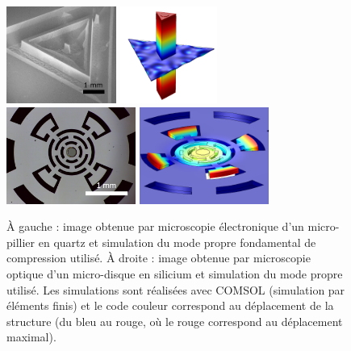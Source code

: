 \documentclass[12pt,a4paper]{article}
\begin{document}
\begin{figure}
\center
\includegraphics[height=90pt]{figures/micropillar.png}
\includegraphics[height=90pt]{figures/micropillar_disp.png}
\includegraphics[height=90pt]{figures/microwheel.png}
\includegraphics[height=90pt]{figures/microwheel_disp.png}
\caption{À gauche : image obtenue par microscopie électronique d'un micro-pillier en quartz et simulation du mode propre fondamental de compression utilisé.
À droite : image obtenue par microscopie optique d'un micro-disque en silicium et simulation du mode propre utilisé.
Les simulations sont réalisées avec COMSOL (simulation par éléments finis) et le code couleur correspond au déplacement de la structure (du bleu au rouge, où le rouge correspond au déplacement maximal).}
\label{fig:resonators}
\end{figure}
\end{document}
